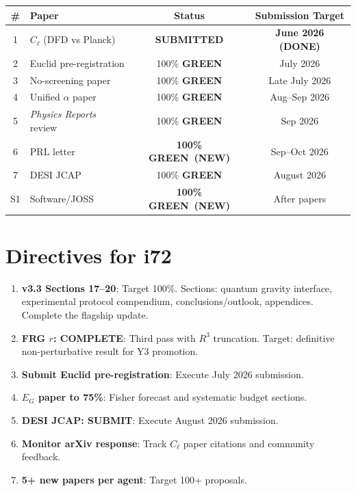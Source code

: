 \documentclass[11pt,a4paper]{article}
\newcommand{\GREEN}{\textcolor{dfdgreen}{\textbf{GREEN}}}
\begin{document}
\begin{center}
\begin{tabular}{clcc}
\toprule
\textbf{\#} & \textbf{Paper} & \textbf{Status} & \textbf{Submission Target} \\
\midrule
1 & $C_\ell$ (DFD vs Planck) & \textbf{SUBMITTED} & \textbf{June 2026 (DONE)} \\
2 & Euclid pre-registration & 100\% \GREEN & July 2026 \\
3 & No-screening paper & 100\% \GREEN & Late July 2026 \\
4 & Unified $\alpha$ paper & 100\% \GREEN & Aug--Sep 2026 \\
5 & \textit{Physics Reports} review & 100\% \GREEN & Sep 2026 \\
6 & PRL letter & \textbf{100\% \GREEN\ (NEW)} & Sep--Oct 2026 \\
7 & DESI JCAP & 100\% \GREEN & August 2026 \\
\midrule
S1 & Software/JOSS & \textbf{100\% \GREEN\ (NEW)} & After papers \\
\bottomrule
\end{tabular}
\end{center}


\section{Directives for i72}
\label{sec:directives}

\begin{enumerate}
\item \textbf{v3.3 Sections 17--20}: Target 100\%. Sections: quantum gravity interface, experimental protocol compendium, conclusions/outlook, appendices. Complete the flagship update.
\item \textbf{FRG $r$: COMPLETE}: Third pass with $R^3$ truncation. Target: definitive non-perturbative result for Y3 promotion.
\item \textbf{Submit Euclid pre-registration}: Execute July 2026 submission.
\item \textbf{$E_G$ paper to 75\%}: Fisher forecast and systematic budget sections.
\item \textbf{DESI JCAP: SUBMIT}: Execute August 2026 submission.
\item \textbf{Monitor arXiv response}: Track $C_\ell$ paper citations and community feedback.
\item \textbf{5+ new papers per agent}: Target 100+ proposals.
\end{enumerate}
\end{document}

